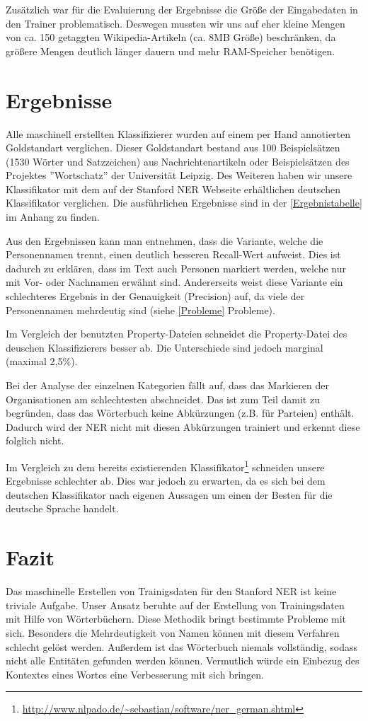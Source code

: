 \documentclass[a4paper]{article}
\begin{document}
	Zusätzlich war für die Evaluierung der Ergebnisse die Größe der Eingabedaten in den Trainer problematisch. Deswegen mussten wir uns auf eher kleine Mengen von ca. 150 getaggten Wikipedia-Artikeln (ca. 8MB Größe) beschränken, da größere Mengen deutlich länger dauern und mehr RAM-Speicher benötigen.
\section{Ergebnisse}
	Alle maschinell erstellten Klassifizierer wurden auf einem per Hand annotierten Goldstandart verglichen.
	Dieser Goldstandart bestand aus 100 Beispielsätzen (1530 Wörter und Satzzeichen) aus Nachrichtenartikeln oder Beispielsätzen des Projektes ''Wortschatz'' der Universität Leipzig.
	Des Weiteren haben wir unsere Klassifikator mit dem auf der Stanford NER Webseite erhältlichen deutschen Klassifikator verglichen.
	Die ausführlichen Ergebnisse sind in der \autoref{Ergebnistabelle} im Anhang zu finden.

	Aus den Ergebnissen kann man entnehmen, dass die Variante, welche die Personennamen trennt, einen deutlich besseren Recall-Wert aufweist.
	Dies ist dadurch zu erklären, dass im Text auch Personen markiert werden, welche nur mit Vor- oder Nachnamen erwähnt sind.
	Andererseits weist diese Variante ein schlechteres Ergebnis in der Genauigkeit (Precision) auf, da viele der Personennamen mehrdeutig sind (siehe \ref{Probleme} Probleme).

	Im Vergleich der benutzten Property-Dateien schneidet die Property-Datei des deuschen Klassifizierers besser ab.
	Die Unterschiede sind jedoch marginal (maximal 2,5\%).

	Bei der Analyse der einzelnen Kategorien fällt auf, dass das Markieren der Organisationen am schlechtesten abschneidet.
	Das ist zum Teil damit zu begründen, dass das Wörterbuch keine Abkürzungen (z.B. für Parteien) enthält.
	Dadurch wird der NER nicht mit diesen Abkürzungen trainiert und erkennt diese folglich nicht.

	Im Vergleich zu dem bereits existierenden Klassifikator\footnote{\url{http://www.nlpado.de/~sebastian/software/ner_german.shtml}} schneiden unsere Ergebnisse schlechter ab.
	Dies war jedoch zu erwarten, da es sich bei dem deutschen Klassifikator nach eigenen Aussagen um einen der Besten für die deutsche Sprache handelt.

\section{Fazit}
	Das maschinelle Erstellen von Trainigsdaten für den Stanford NER ist keine triviale Aufgabe.
	Unser Ansatz beruhte auf der Erstellung von Trainingsdaten mit Hilfe von Wörterbüchern.
	Diese Methodik bringt bestimmte Probleme mit sich.
	Besonders die Mehrdeutigkeit von Namen können mit diesem Verfahren schlecht gelöst werden.
	Außerdem ist das Wörterbuch niemals vollständig, sodass nicht alle Entitäten gefunden werden können.
	Vermutlich würde ein Einbezug des Kontextes eines Wortes eine Verbesserung mit sich bringen.
\end{document}
